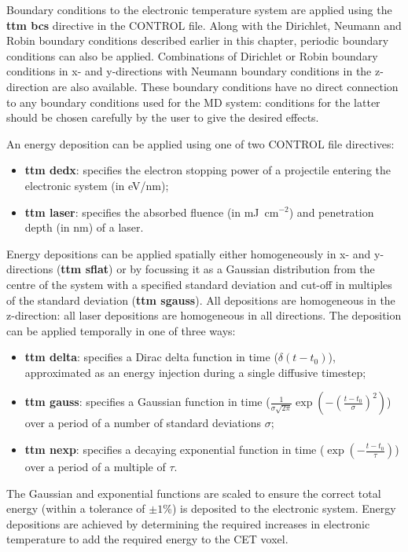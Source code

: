 Boundary conditions to the electronic temperature system are applied 
using the {\bf ttm bcs} directive in the CONTROL file. Along with the 
Dirichlet, Neumann and Robin boundary conditions described earlier in 
this chapter, periodic boundary conditions can also be applied. 
Combinations of Dirichlet or Robin boundary conditions in x- and 
y-directions with Neumann boundary conditions in the z-direction are 
also available. These boundary conditions have no direct connection to  
any boundary conditions used for the MD system: conditions for the 
latter should be chosen carefully by the user to give the desired effects.

An energy deposition can be applied using one of two CONTROL file 
directives:
\begin{itemize}
\item {\bf ttm dedx}: specifies the electron stopping power of a projectile entering the electronic system (in eV/nm);
\item {\bf ttm laser}: specifies the absorbed fluence (in mJ~cm$^{-2}$) and penetration depth (in nm) of a laser.
\end{itemize}
Energy depositions can be applied spatially either homogeneously in 
x- and y-directions ({\bf ttm sflat}) or by focussing it as a Gaussian 
distribution from the centre of the system with a specified standard 
deviation and cut-off in multiples of the standard deviation ({\bf ttm 
sgauss}). All depositions are homogeneous in the z-direction: all laser 
depositions are homogeneous in all directions. The deposition can be 
applied temporally in one of three ways:
\begin{itemize}
\item {\bf ttm delta}: specifies a Dirac delta function in time ($\delta (t - t_0)$), approximated as an energy injection during a single diffusive timestep;
\item {\bf ttm gauss}: specifies a Gaussian function in time ($\frac{1}{\sigma\sqrt{2\pi}}\exp\left(-\left(\frac{t-t_0}{\sigma}\right)^2 \right)$) over a period of a number of standard deviations $\sigma$;
\item {\bf ttm nexp}: specifies a decaying exponential function in time ($\exp \left(-\frac{t-t_0}{\tau}\right)$) over a period of a multiple of $\tau$.
\end{itemize}
The Gaussian and exponential functions are scaled to ensure the 
correct total energy (within a tolerance of $\pm 1$\%) is deposited 
to the electronic system. Energy depositions are achieved by 
determining the required increases in electronic temperature to add 
the required energy to the CET voxel.

